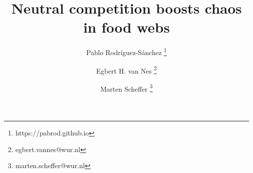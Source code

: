 \usepackage[center,width=152mm,height=235mm]{crop}

\usepackage[english]{babel}
\usepackage[latin1]{inputenc}
\usepackage[T1]{fontenc}
\usepackage{selinput}

\usepackage{float} %
\usepackage{amsthm, amsmath, amsfonts, amssymb}
\usepackage{fancybox}
\usepackage{color}
\usepackage{cite}
\usepackage{url}

\usepackage{graphicx}
\graphicspath{ {./img/} }

\usepackage[draft, colorinlistoftodos]{todonotes} %

\usepackage[switch]{lineno}

\newcommand{\numReps}{200} %
\newcommand{\stabilTime}{2000} %
\newcommand{\simTime}{5000} %
\newcommand{\numEpsilons}{23} %
\newcommand{\numExps}{4600} %

\usepackage{authblk}
\title{Neutral competition boosts chaos in food webs}
\author[1]{Pablo Rodríguez-Sánchez \thanks{https://pabrod.github.io}}
\author[1]{Egbert H. van Nes \thanks{egbert.vannes@wur.nl}}
\author[1]{Marten Scheffer \thanks{marten.scheffer@wur.nl}}

